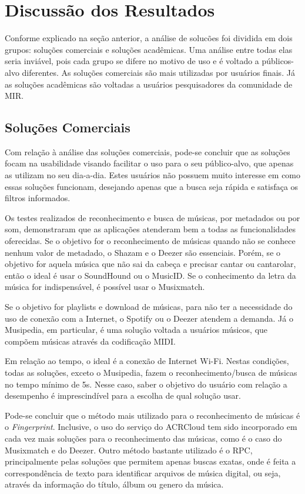 \section{Discussão dos Resultados} \label{sec:resultados}

Conforme explicado na seção anterior, a análise de solucões foi dividida em dois grupos: soluções comerciais e soluções acadêmicas. Uma análise entre todas elas seria inviável, pois cada grupo se difere no motivo de uso e é voltado a públicos-alvo diferentes. As soluções comerciais são mais utilizadas por usuários finais. Já as soluções acadêmicas são voltadas a usuários pesquisadores da comunidade de MIR.

\subsection{Soluções Comerciais}

Com relação à análise das soluções comerciais, pode-se concluir que as soluções focam na usabilidade visando facilitar o uso para o seu público-alvo, que apenas as utilizam no seu dia-a-dia. Estes usuários não possuem muito interesse em como essas soluções funcionam, desejando apenas que a busca seja rápida e satisfaça os filtros informados.

Os testes realizados de reconhecimento e busca de músicas, por metadados ou por som, demonstraram que as aplicações atenderam bem a todas as funcionalidades oferecidas. Se o objetivo for o reconhecimento de músicas quando não se conhece nenhum valor de metadado, o Shazam e o Deezer são essenciais. Porém, se o objetivo for aquela música que não sai da cabeça e precisar cantar ou cantarolar, então o ideal é usar o SoundHound ou o MusicID. Se o conhecimento da letra da música for indispensável, é possível usar o Musixmatch.

Se o objetivo for playlists e download de músicas, para não ter a necessidade do uso de conexão com a Internet, o Spotify ou o Deezer atendem a demanda. Já o Musipedia, em particular, é uma solução voltada a usuários músicos, que compõem músicas através da codificação MIDI.

Em relação ao tempo, o ideal é a conexão de Internet Wi-Fi. Nestas condições, todas as soluções, exceto o Musipedia, fazem o reconhecimento/busca de músicas no tempo mínimo de 5s. Nesse caso, saber o objetivo do usuário com relação a desempenho é imprescindível para a escolha de qual solução usar.

Pode-se concluir que o método mais utilizado para o reconhecimento de músicas é o \textit{Fingerprint}. Inclusive, o uso do serviço do ACRCloud tem sido incorporado em cada vez mais soluções para o reconhecimento das músicas, como é o caso do Musixmatch e do Deezer. Outro método bastante utilizado é o RPC, principalmente pelas soluções que permitem apenas buscas exatas, onde é feita a correspondência de texto para identificar arquivos de música digital, ou seja, através da informação do título, álbum ou genero da música.


